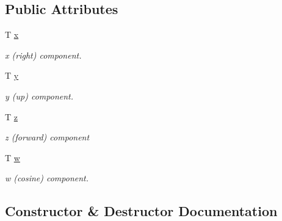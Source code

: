 \subsection*{Public Attributes}
\begin{DoxyCompactItemize}
\item 
T \hyperlink{classsparky_1_1_quaternion_a7da54206cf4aee17b8a4f8f37fb5e933}{x}\hypertarget{classsparky_1_1_quaternion_a7da54206cf4aee17b8a4f8f37fb5e933}{}\label{classsparky_1_1_quaternion_a7da54206cf4aee17b8a4f8f37fb5e933}

\begin{DoxyCompactList}\small\item\em x (right) component. \end{DoxyCompactList}\item 
T \hyperlink{classsparky_1_1_quaternion_afad75ff6f17af570e1dc5282fed93fd2}{y}\hypertarget{classsparky_1_1_quaternion_afad75ff6f17af570e1dc5282fed93fd2}{}\label{classsparky_1_1_quaternion_afad75ff6f17af570e1dc5282fed93fd2}

\begin{DoxyCompactList}\small\item\em y (up) component. \end{DoxyCompactList}\item 
T \hyperlink{classsparky_1_1_quaternion_adb942fb7394e572a57d4ddb4cb50131a}{z}\hypertarget{classsparky_1_1_quaternion_adb942fb7394e572a57d4ddb4cb50131a}{}\label{classsparky_1_1_quaternion_adb942fb7394e572a57d4ddb4cb50131a}

\begin{DoxyCompactList}\small\item\em z (forward) component \end{DoxyCompactList}\item 
T \hyperlink{classsparky_1_1_quaternion_a6de3864be1208046ce06ae5b8d130e28}{w}\hypertarget{classsparky_1_1_quaternion_a6de3864be1208046ce06ae5b8d130e28}{}\label{classsparky_1_1_quaternion_a6de3864be1208046ce06ae5b8d130e28}

\begin{DoxyCompactList}\small\item\em w (cosine) component. \end{DoxyCompactList}\end{DoxyCompactItemize}


\subsection{Constructor \& Destructor Documentation}
